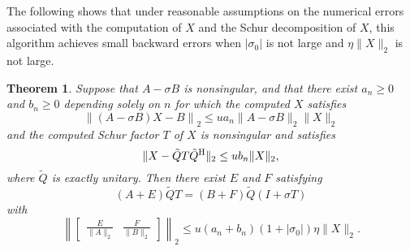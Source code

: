 \documentclass[12pt]{article}
\def\H{{\rm H}}
\newtheorem{theorem}{Theorem}
\begin{document}
The following shows that under reasonable assumptions on the numerical
errors associated with the computation of $X$ and the Schur
decomposition of $X$, this algorithm achieves small backward errors
when $|\sigma_0|$ is not large and $\eta \|X\|_2$ is not large.
\begin{theorem}
  \label{th:deflating_subspaces}
  Suppose that $A-\sigma B$ is nonsingular, and that there exist
  $a_n\geq 0$ and $b_n\geq 0$ depending solely on $n$ for which the
  computed $X$ satisfies
  \begin{equation}
    \label{eq:Xerror}
    \left\| (A-\sigma B) X - B \right\|_2 \leq u a_n \|A-\sigma B\|_2 \|X\|_2
  \end{equation}
  and the computed Schur factor $T$ of $X$ is nonsingular and satisfies
  \begin{equation}
    \label{eq:schur_error}
    \| X - \tilde{Q} T \tilde{Q}^\H \|_2 \leq u b_n \|X\|_2,
  \end{equation}
  where $\tilde{Q}$ is exactly unitary.  Then there exist $E$ and $F$
  satisfying
  \begin{equation*}
    (A+E)\tilde{Q} T = (B+F)\tilde{Q}(I+\sigma T)
  \end{equation*}
  with
  \begin{equation*}
    \left\|
      \begin{bmatrix}
        \frac{E}{\|A\|_2} & \frac{F}{\|B\|_2}
      \end{bmatrix}
    \right\|_2 \leq u (a_n + b_n)(1+|\sigma_0|) \eta \|X\|_2.
  \end{equation*}
\end{theorem}
\end{document}
